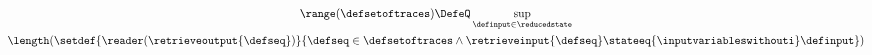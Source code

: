 
\begin{gather*}
  \range(\defsetoftraces) \DefeQ \sup_{\definput\in\reducedstate} \\
      \length(\setdef{
        \reader(\retrieveoutput{\defseq})
      }{
        \defseq \in \defsetoftraces \land \retrieveinput{\defseq} \stateeq{\inputvariableswithouti} \definput
      })
\end{gather*}

